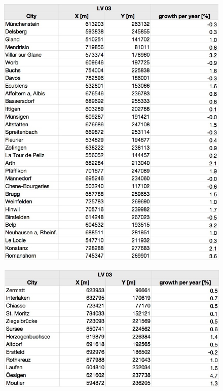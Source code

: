 \documentclass[11pt]{scrartcl}
\begin{document}
\begin{figure}[H]
	\centering
	\includegraphics[width=1.0\textwidth]{figures/city_list4}
\end{figure}

\begin{figure}[H]
	\centering
	\includegraphics[width=1.0\textwidth]{figures/city_list5}
\end{figure}









\end{document}
